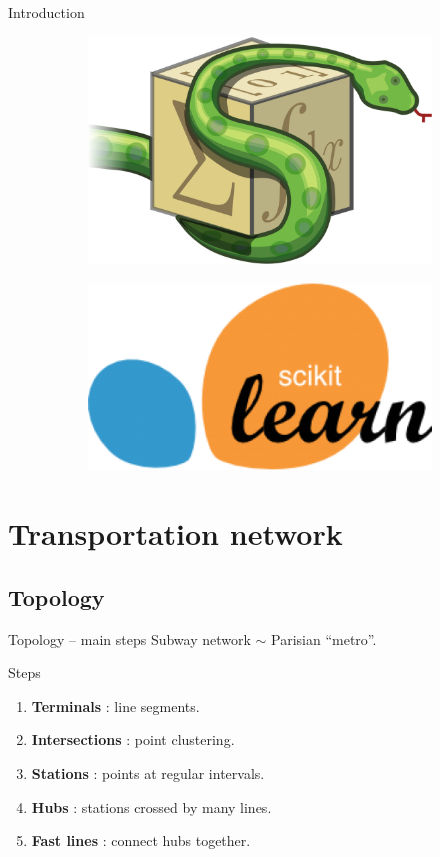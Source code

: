 \begin{frame}[fragile]{Introduction}
\begin{figure}
\begin{subfigure}{.24\textwidth}
			\centering
			\includegraphics[width=.5\linewidth]{images/sympy.png}
		\end{subfigure}%
		\begin{subfigure}{.24\textwidth}
			\centering
			\includegraphics[width=.5\linewidth]{images/sklearn.png}
		\end{subfigure}
	\end{figure}
\end{frame}

\section{Transportation network}
\subsection{Topology}
\begin{frame}{Topology -- main steps}
	Subway network $\sim$ Parisian ``metro''.
	\begin{block}{Steps}
		\begin{enumerate}
			\item \textbf{Terminals} : line segments.
			\item \textbf{Intersections} : point clustering.
			\item \textbf{Stations} : points at regular intervals. 
			\item \textbf{Hubs} : stations crossed by many lines.
			\item \textbf{Fast lines} : connect hubs together.
		\end{enumerate}
	\end{block}
\end{frame}

